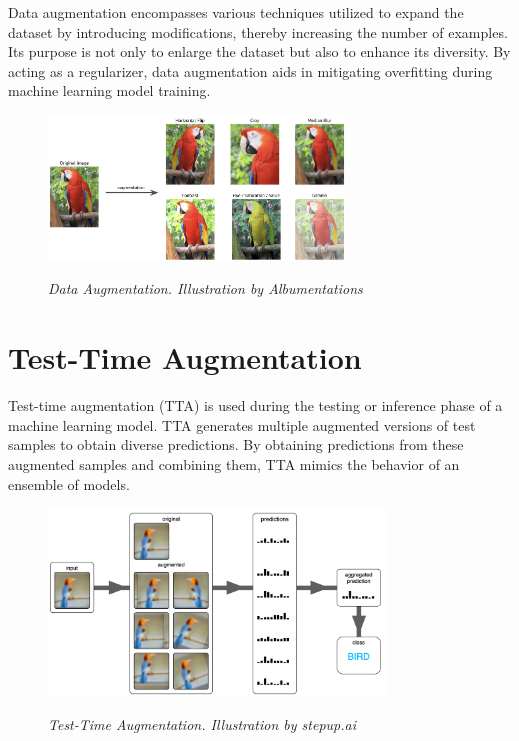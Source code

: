 Data augmentation encompasses various techniques utilized to expand the dataset by introducing modifications, thereby increasing the number of examples. Its purpose is not only to enlarge the dataset but also to enhance its diversity. By acting as a regularizer, data augmentation aids in mitigating overfitting during machine learning model training.

\begin{figure}[H]
\centering
\includegraphics[width=0.7\textwidth]{imatges/preliminaries/augmentation.jpg}
\caption[Data Augmentation]{\textit{Data Augmentation. Illustration by Albumentations}}
{\label{fig:augmentation}}
\end{figure}


\section{Test-Time Augmentation}

Test-time augmentation (TTA) is used during the testing or inference phase of a machine learning model. TTA generates multiple augmented versions of test samples to obtain diverse predictions. By obtaining predictions from these augmented samples and combining them, TTA mimics the behavior of an ensemble of models.

\begin{figure}[H]
\centering
\includegraphics[width=0.8\textwidth]{imatges/preliminaries/tta.png}
\caption[Test-Time Augmentation]{\textit{Test-Time Augmentation. Illustration by stepup.ai}}
{\label{fig:tta}}
\end{figure}

